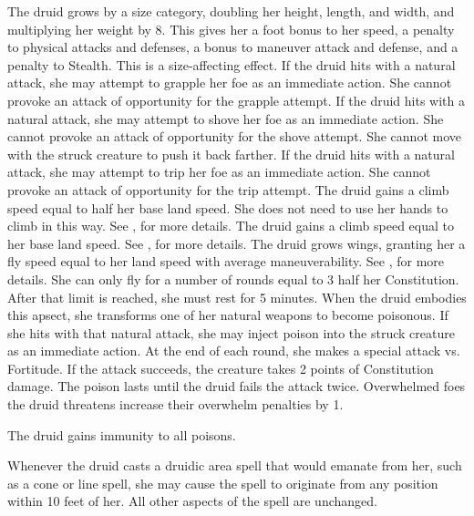  The druid grows by a size category, doubling her height, length, and width, and multiplying her weight by 8. This gives her a  foot bonus to her speed, a  penalty to physical attacks and defenses, a  bonus to maneuver attack and defense, and a  penalty to Stealth. This is a size-affecting effect.
 If the druid hits with a natural attack, she may attempt to grapple her foe as an immediate action. She cannot provoke an attack of opportunity for the grapple attempt.
 If the druid hits with a natural attack, she may attempt to shove her foe as an immediate action. She cannot provoke an attack of opportunity for the shove attempt. She cannot move with the struck creature to push it back farther. 
 If the druid hits with a natural attack, she may attempt to trip her foe as an immediate action. She cannot provoke an attack of opportunity for the trip attempt.
 The druid gains a climb speed equal to half her base land speed. She does not need to use her hands to climb in this way. See , for more details.
 The druid gains a climb speed equal to her base land speed. See , for more details.
 The druid grows wings, granting her a fly speed equal to her land speed with average maneuverability. See , for more details. She can only fly for a number of rounds equal to 3 \add half her Constitution. After that limit is reached, she must rest for 5 minutes.
 When the druid embodies this apsect, she transforms one of her natural weapons to become poisonous. If she hits with that natural attack, she may inject poison into the struck creature as an immediate action. At the end of each round, she makes a special attack vs. Fortitude. If the attack succeeds, the creature takes 2 points of Constitution damage. The poison lasts until the druid fails the attack twice.
 Overwhelmed foes the druid threatens increase their overwhelm penalties by 1.

 The druid gains immunity to all poisons.

 Whenever the druid casts a druidic area spell that would emanate from her, such as a cone or line spell, she may cause the spell to originate from any position within 10 feet of her. All other aspects of the spell are unchanged.

